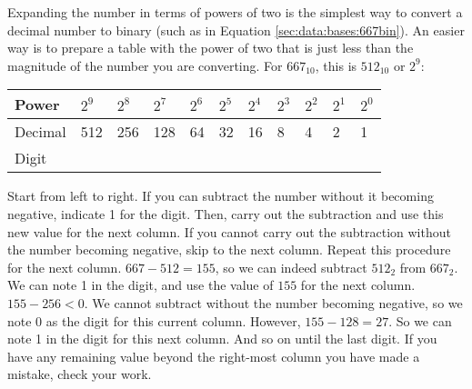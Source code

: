 \begin{figure}[h!]
\end{figure}

Expanding the number in terms of powers of two is the simplest way to convert a decimal number %
to binary (such as in Equation \ref{sec:data:bases:667bin}). An easier way is to prepare a table with the %
power of two that is just less than the magnitude of the number you are converting. For $667_{10}$, this is %
$512_{10}$ or $2^9$:

\vspace{1em} %
\begin{tabular}{|l|l|l|l|l|l|l|l|l|l|l|}\hline
Power & $2^9$ & $2^8$ & $2^7$ & $2^6$ & $2^5$ & $2^4$ & $2^3$ & $2^2$ & $2^1$ & $2^0$ \\\hline\hline
Decimal & 512 & 256 & 128 & 64 & 32 & 16 & 8 & 4 & 2 & 1 \\\hline
Digit &  &  &  &  &  &  &  &  &  &  \\\hline
\end{tabular}
\vspace{1em}

Start from left to right. If you can subtract the number without it becoming negative, indicate 1 for the digit. %
Then, carry out the subtraction and use this new value for the next column. If you cannot carry out the subtraction %
without the number becoming negative, skip to the next column. Repeat this procedure for the next column. %
$667-512=155$, so we can indeed subtract $512_2$ from $667_2$. We can note 1 in the digit, and use the value of $155$ %
for the next column. $155-256<0$. We cannot subtract without the number becoming negative, so we note 0 as the digit %
for this current column. However, $155-128=27$. So we can note 1 in the digit for this next column. And so on until %
the last digit. If you have any remaining value beyond the right-most column you have made a mistake, check your work. %

